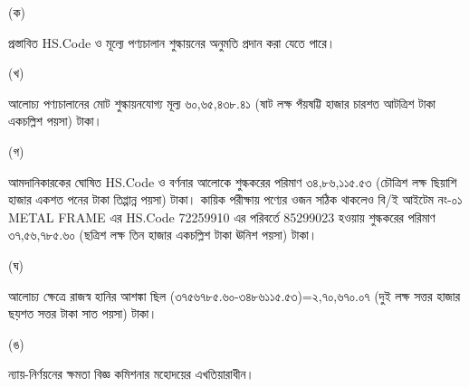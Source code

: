 \documentclass[12pt]{article}
\begin{document}
\begin{minipage}[t]{0.05\linewidth}
(ক)
\end{minipage}
\begin{minipage}[t]{0.90\linewidth}
প্রস্তাবিত HS.Code ও মূল্যে পণ্যচালান শুল্কায়নের অনুমতি প্রদান করা যেতে পারে।
\\
\end{minipage}
\begin{minipage}[t]{0.05\linewidth}
\hspace{0em}
\end{minipage}
\begin{minipage}[t]{0.05\linewidth}
(খ)
\end{minipage}
\begin{minipage}[t]{0.90\linewidth}
আলোচ্য পণ্যচালানের মোট শুল্কায়নযোগ্য
মূল্য ৬০,৬৫,৪৩৮.৪১ (ষাট লক্ষ পঁয়ষট্টি হাজার চারশত আটত্রিশ টাকা একচল্লিশ পয়সা) টাকা।
\\
\end{minipage}
\begin{minipage}[t]{0.05\linewidth}
\hspace{0em}
\end{minipage}
\begin{minipage}[t]{0.05\linewidth}
(গ)
\end{minipage}
\begin{minipage}[t]{0.90\linewidth}
আমদানিকারকের ঘোষিত HS.Code ও বর্ণনার আলোকে শুল্ককরের পরিমাণ ৩৪,৮৬,১১৫.৫৩ (চৌত্রিশ লক্ষ ছিয়াশি হাজার একশত পনের টাকা তিপ্পান্ন পয়সা) টাকা।
কায়িক পরীক্ষায় পণ্যের ওজন সঠিক থাকলেও বি/ই আইটেম নং-০১ METAL FRAME এর HS.Code 72259910 এর পরিবর্তে 85299023 হওয়ায় শুল্ককরের
পরিমাণ
৩৭,৫৬,৭৮৫.৬০ (ছত্রিশ লক্ষ তিন হাজার একচল্লিশ টাকা ঊনিশ পয়সা) টাকা।
\\
\end{minipage}
\begin{minipage}[t]{0.05\linewidth}
\hspace{0em}
\end{minipage}
\begin{minipage}[t]{0.05\linewidth}
(ঘ)
\end{minipage}
\begin{minipage}[t]{0.90\linewidth}
আলোচ্য ক্ষেত্রে রাজস্ব হানির আশঙ্কা ছিল
(৩৭৫৬৭৮৫.৬০-৩৪৮৬১১৫.৫৩)=২,৭০,৬৭০.০৭
(দুই লক্ষ সত্তর হাজার ছয়শত সত্তর টাকা সাত পয়সা) টাকা।
\\
\end{minipage}
\begin{minipage}[t]{0.05\linewidth}
\hspace{0em}
\end{minipage}
\begin{minipage}[t]{0.05\linewidth}
(ঙ)
\end{minipage}
\begin{minipage}[t]{0.90\linewidth}
ন্যায়-নির্ণয়নের ক্ষমতা বিজ্ঞ কমিশনার মহোদয়ের এখতিয়ারাধীন।
\end{minipage}
\end{document}

